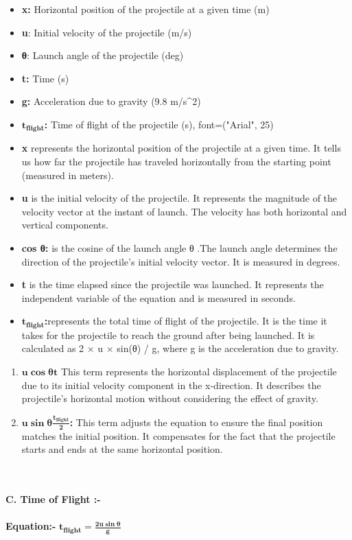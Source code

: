 \documentclass{article}
\begin{document}
\begin{itemize}
\item
  \textbf{x:} Horizontal position of the projectile at a given time (m)
\item
  \textbf{u}: Initial velocity of the projectile (m/s)
\item
  \textbf{θ}: Launch angle of the projectile (deg)
\item
  \textbf{t:} Time (s)
\item
  \textbf{g:} Acceleration due to gravity (9.8 m/s\^{}2)
\item
  \(\mathbf{t}_{\mathbf{\text{flight}}}\)\textbf{:} Time of flight of
  the projectile (s), font=("Arial", 25)
\end{itemize}

\begin{itemize}
\item
  \textbf{x} represents the horizontal position of the projectile at a
  given time. It tells us how far the projectile has traveled
  horizontally from the starting point (measured in meters).
\item
  \textbf{u} is the initial velocity of the projectile. It represents
  the magnitude of the velocity vector at the instant of launch. The
  velocity has both horizontal and vertical components.
\item
  \textbf{cos θ:} is the cosine of the launch angle θ .The launch angle
  determines the direction of the projectile's initial velocity vector.
  It is measured in degrees.
\item
  \textbf{t} is the time elapsed since the projectile was launched. It
  represents the independent variable of the equation and is measured in
  seconds.
\item
  \(\mathbf{t}_{\mathbf{\text{flight}}}\)\textbf{:}represents the total
  time of flight of the projectile. It is the time it takes for the
  projectile to reach the ground after being launched. It is calculated
  as 2 × u × sin(θ) / g, where g is the acceleration due to gravity.
\end{itemize}

\begin{enumerate}
\def\labelenumi{\arabic{enumi}.}
\item
  \(\mathbf{u}\mathbf{\cos}\mathbf{\text{θt}}\) This term represents the
  horizontal displacement of the projectile due to its initial velocity
  component in the x-direction. It describes the projectile's horizontal
  motion without considering the effect of gravity.
\item
  \(\mathbf{u}\mathbf{\sin}\mathbf{\theta}\frac{\mathbf{t}_{\mathbf{\text{flight}}}}{\mathbf{2}}\)\textbf{:}
  This term adjusts the equation to ensure the final position matches
  the initial position. It compensates for the fact that the projectile
  starts and ends at the same horizontal position.
\end{enumerate}
\\
\\
\textbf{C. Time of Flight :-}
\\
\\
\textbf{Equation:-}
\(\mathbf{t}_{\mathbf{\text{flight}}}\mathbf{=}\frac{\mathbf{2}\mathbf{u}\mathbf{\sin}\mathbf{\theta}}{\mathbf{g}}\)
\end{document}
